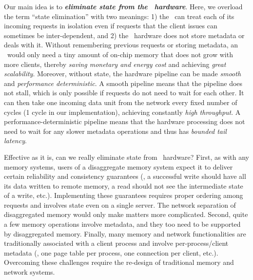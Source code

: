Our main idea is to \textbf{\textit{eliminate state from the \MN\ hardware}}.
Here, we overload the term ``state elimination'' with two meanings: 1) the \MN\ can treat each of its incoming requests in isolation even if requests that the client issues can sometimes be inter-dependent, 
and 2) the \MN\ hardware does not store metadata or deals with it.
Without remembering previous requests or storing metadata, an \MN\ would only need a tiny amount of on-chip memory that does not grow with more clients, thereby {\em saving monetary and energy cost} and achieving {\em great scalability}.
Moreover, without state, the hardware pipeline can be made {\em smooth} and {\em performance deterministic}.
A smooth pipeline means that the pipeline does not stall, which is only possible if requests do not need to wait for each other.
It can then take one incoming data unit from the network every fixed number of cycles (1 cycle in our implementation), achieving constantly {\em high throughput}.
A performance-deterministic pipeline means that the hardware processing does not need to wait for any slower metadata operations and thus has {\em bounded tail latency}.

Effective as it is, can we really eliminate state from \MN\ hardware? 
First, as with any memory systems, users of a disaggregate memory system expect it to deliver certain reliability and consistency guarantees (\eg, a successful write should have all its data written to remote memory, a read should not see the intermediate state of a write, etc.). 
Implementing these guarantees requires proper ordering among requests and involves state even on a single server. 
The network separation of disaggregated memory would only make matters more complicated.
Second, quite a few memory operations involve metadata, and they too need to be supported by disaggregated memory.
Finally, many memory and network functionalities are traditionally associated with a client process and involve per-process/client metadata (\eg, one page table per process, one connection per client, etc.). 
Overcoming these challenges require the re-design of traditional memory and network systems.

